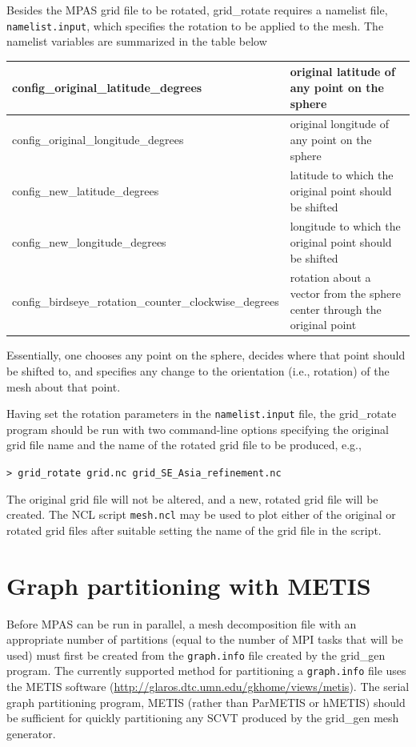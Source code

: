 \documentclass[11pt]{report}
\begin{document}
Besides the MPAS grid file to be rotated, grid\_rotate requires a namelist file, {\tt namelist.input}, which specifies the rotation to be applied to the mesh. The namelist variables are summarized in the table below
   
\vspace{12pt}
\begin{longtable}{|p{3.25in} |p{2.5in}|}
\hline
config\_original\_latitude\_degrees & original latitude of any point on the sphere \\ \hline
config\_original\_longitude\_degrees & original longitude of any point on the sphere \\ \hline
config\_new\_latitude\_degrees &  latitude to which the original point should be shifted \\ \hline
config\_new\_longitude\_degrees &  longitude to which the original point should be shifted \\ \hline
config\_birdseye\_rotation\_counter\_clockwise\_degrees & rotation about a vector from the sphere center through the original point \\ \hline
\end{longtable}
\vspace{12pt}

\noindent Essentially, one chooses any point on the sphere, decides where that point should be shifted to,
and specifies any change to the orientation (i.e., rotation) of the mesh about that point. 

Having set the rotation parameters in the {\tt namelist.input} file, the grid\_rotate program should be run with two command-line options
specifying the original grid file name and the name of the rotated grid file to be produced, e.g.,

\vspace{12pt}
{\tt > grid\_rotate grid.nc grid\_SE\_Asia\_refinement.nc}
\vspace{12pt}

The original grid file will not be altered, and a new, rotated grid file will be created. The NCL script {\tt mesh.ncl} may be used to plot either of the original or rotated grid files after suitable setting the name of the grid file in the script.
   
   
\section{Graph partitioning with METIS} 
\label{sec:metis}

Before MPAS can be run in parallel, a mesh decomposition file with an appropriate number of 
partitions (equal to the number of MPI tasks that will be used) must first be created from the {\tt graph.info}
file created by the grid\_gen program. The currently supported method for partitioning a {\tt graph.info} file
uses the METIS software (\url{http://glaros.dtc.umn.edu/gkhome/views/metis}). The serial graph partitioning program, METIS (rather than ParMETIS or hMETIS) should be sufficient for quickly partitioning any SCVT produced by the grid\_gen mesh generator.
\end{document}

